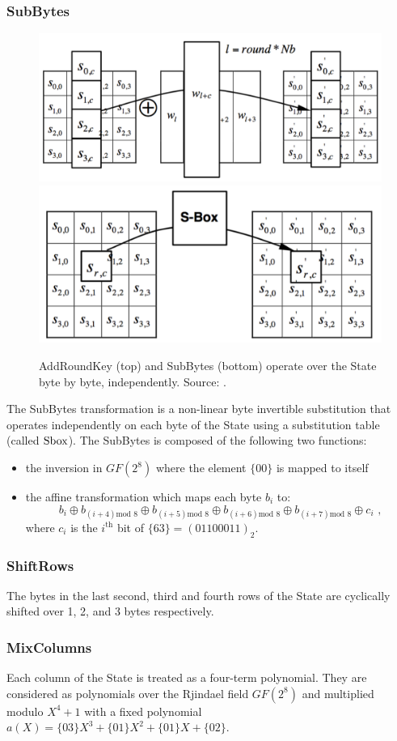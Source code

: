 \subsubsection*{SubBytes}
\begin{figure}
\centering
\includegraphics[width = .60\textwidth]{../Figures/FISP_AES/add_round_key.pdf} 
\includegraphics[width = .45\textwidth]{../Figures/FISP_AES/sbox.pdf} 
\caption[AddRoundKey and SubBytes.]{AddRoundKey (top) and SubBytes (bottom) operate over the State byte by byte, independently. Source: \cite{nist197}.}\label{fig:AES_sbox}
\end{figure}
The SubBytes transformation is a non-linear byte invertible substitution that operates independently on each byte of the State using a substitution table (called $\mathrm{Sbox}$). The SubBytes is composed of the following two functions:
\begin{itemize}
\item the inversion in $GF(2^8)$ where the element $\{00\}$ is mapped to itself
\item the affine transformation which maps each byte $b_i$ to:
\begin{equation}
b_i \oplus b_{(i+4)\mbox{mod }8} \oplus b_{(i+5)\mbox{mod }8} \oplus b_{(i+6)\mbox{mod }8} \oplus b_{(i+7)\mbox{mod }8} \oplus c_i \mbox{ ,}
\end{equation}
 where $c_i$ is the $i^\text{th}$ bit of $\{63\}  = (01100011)_2$.
\end{itemize}  
\subsubsection*{ShiftRows}
The bytes in the last second, third and fourth rows of the State are cyclically shifted over 1, 2, and 3 bytes respectively.
\subsubsection*{MixColumns}
Each column of the State is treated as a four-term polynomial. They are considered as polynomials over the Rjindael field $GF(2^8)$ and multiplied modulo $X^4 +1$ with a fixed polynomial $a(X) = \{03\}X^3 +\{01\}X^2 + \{01\}X + \{02\}$.

